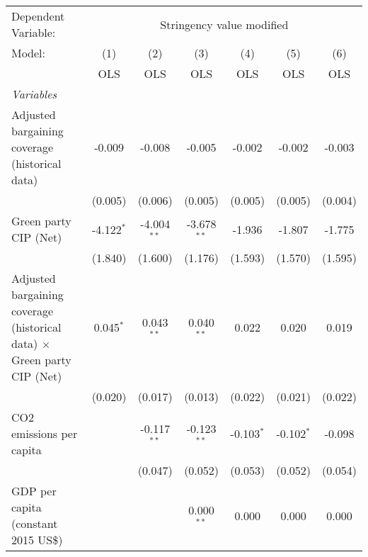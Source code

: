 
\begingroup
\centering
\begin{tabular}{lcccccc}
   \toprule
   Dependent Variable: & \multicolumn{6}{c}{Stringency value modified}\\
   Model:                                                                         & (1)          & (2)           & (3)           & (4)          & (5)          & (6)\\  
                                                                                  &  OLS         & OLS           & OLS           & OLS          & OLS          & OLS\\  
   \midrule
   \emph{Variables}\\
   Adjusted bargaining coverage (historical data)                                 & -0.009       & -0.008        & -0.005        & -0.002       & -0.002       & -0.003\\   
                                                                                  & (0.005)      & (0.006)       & (0.005)       & (0.005)      & (0.005)      & (0.004)\\   
   Green party CIP (Net)                                                          & -4.122$^{*}$ & -4.004$^{**}$ & -3.678$^{**}$ & -1.936       & -1.807       & -1.775\\   
                                                                                  & (1.840)      & (1.600)       & (1.176)       & (1.593)      & (1.570)      & (1.595)\\   
   Adjusted bargaining coverage (historical data) $\times$ Green party CIP (Net)  & 0.045$^{*}$  & 0.043$^{**}$  & 0.040$^{**}$  & 0.022        & 0.020        & 0.019\\   
                                                                                  & (0.020)      & (0.017)       & (0.013)       & (0.022)      & (0.021)      & (0.022)\\   
   CO2 emissions per capita                                                       &              & -0.117$^{**}$ & -0.123$^{**}$ & -0.103$^{*}$ & -0.102$^{*}$ & -0.098\\   
                                                                                  &              & (0.047)       & (0.052)       & (0.053)      & (0.052)      & (0.054)\\   
   GDP per capita (constant 2015 US\$)                                            &              &               & 0.000$^{**}$  & 0.000        & 0.000        & 0.000\\   

\end{tabular}

